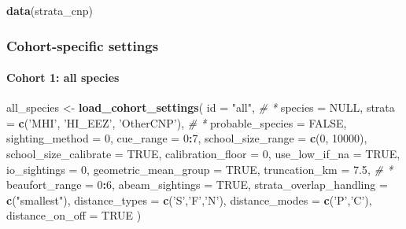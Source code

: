 \documentclass[
]{book}
\newenvironment{Shaded}{\begin{snugshade}}{\end{snugshade}}
\newcommand{\CommentTok}[1]{\textcolor[rgb]{0.56,0.35,0.01}{\textit{#1}}}
\newcommand{\DataTypeTok}[1]{\textcolor[rgb]{0.13,0.29,0.53}{#1}}
\newcommand{\DecValTok}[1]{\textcolor[rgb]{0.00,0.00,0.81}{#1}}
\newcommand{\FloatTok}[1]{\textcolor[rgb]{0.00,0.00,0.81}{#1}}
\newcommand{\KeywordTok}[1]{\textcolor[rgb]{0.13,0.29,0.53}{\textbf{#1}}}
\newcommand{\NormalTok}[1]{#1}
\newcommand{\OperatorTok}[1]{\textcolor[rgb]{0.81,0.36,0.00}{\textbf{#1}}}
\newcommand{\OtherTok}[1]{\textcolor[rgb]{0.56,0.35,0.01}{#1}}
\newcommand{\StringTok}[1]{\textcolor[rgb]{0.31,0.60,0.02}{#1}}
\begin{document}
\begin{Shaded}
\begin{Highlighting}[]
\KeywordTok{data}\NormalTok{(strata_cnp)}
\end{Highlighting}
\end{Shaded}

\hypertarget{cohort-specific-settings-2}{%
\subsubsection*{Cohort-specific settings}\label{cohort-specific-settings-2}}

\hypertarget{cohort-1-all-species-1}{%
\paragraph{Cohort 1: all species}\label{cohort-1-all-species-1}}

\begin{Shaded}
\begin{Highlighting}[]
\NormalTok{all_species <-}\StringTok{ }\KeywordTok{load_cohort_settings}\NormalTok{(}
  \DataTypeTok{id =} \StringTok{"all"}\NormalTok{, }\CommentTok{# *}
  \DataTypeTok{species =} \OtherTok{NULL}\NormalTok{, }
  \DataTypeTok{strata =} \KeywordTok{c}\NormalTok{(}\StringTok{'MHI'}\NormalTok{, }\StringTok{'HI_EEZ'}\NormalTok{, }\StringTok{'OtherCNP'}\NormalTok{), }\CommentTok{# *}
  \DataTypeTok{probable_species =} \OtherTok{FALSE}\NormalTok{,}
  \DataTypeTok{sighting_method =} \DecValTok{0}\NormalTok{,}
  \DataTypeTok{cue_range =} \DecValTok{0}\OperatorTok{:}\DecValTok{7}\NormalTok{,}
  \DataTypeTok{school_size_range =} \KeywordTok{c}\NormalTok{(}\DecValTok{0}\NormalTok{, }\DecValTok{10000}\NormalTok{),}
  \DataTypeTok{school_size_calibrate =} \OtherTok{TRUE}\NormalTok{,}
  \DataTypeTok{calibration_floor =} \DecValTok{0}\NormalTok{,}
  \DataTypeTok{use_low_if_na =} \OtherTok{TRUE}\NormalTok{,}
  \DataTypeTok{io_sightings =} \DecValTok{0}\NormalTok{,}
  \DataTypeTok{geometric_mean_group =} \OtherTok{TRUE}\NormalTok{,}
  \DataTypeTok{truncation_km =} \FloatTok{7.5}\NormalTok{, }\CommentTok{# *}
  \DataTypeTok{beaufort_range =} \DecValTok{0}\OperatorTok{:}\DecValTok{6}\NormalTok{,}
  \DataTypeTok{abeam_sightings =} \OtherTok{TRUE}\NormalTok{,}
  \DataTypeTok{strata_overlap_handling =} \KeywordTok{c}\NormalTok{(}\StringTok{"smallest"}\NormalTok{),}
  \DataTypeTok{distance_types =} \KeywordTok{c}\NormalTok{(}\StringTok{'S'}\NormalTok{,}\StringTok{'F'}\NormalTok{,}\StringTok{'N'}\NormalTok{),}
  \DataTypeTok{distance_modes =} \KeywordTok{c}\NormalTok{(}\StringTok{'P'}\NormalTok{,}\StringTok{'C'}\NormalTok{),}
  \DataTypeTok{distance_on_off =} \OtherTok{TRUE}
\NormalTok{)}
\end{Highlighting}
\end{Shaded}
\end{document}
